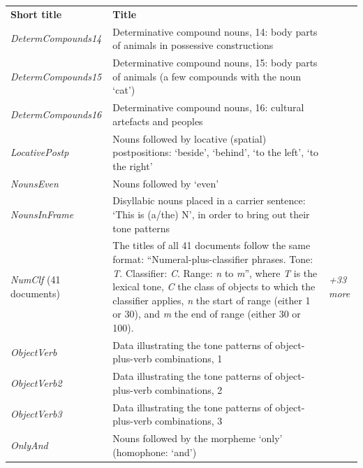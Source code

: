 \begin{table}[H]
  {\renewcommand{\arraystretch}{1.35}
    \begin{tabularx}{\textwidth}{ @{}l Q >{\raggedleft\arraybackslash}P{20mm}}
  \textbf{Short title} & \textbf{Title} &  \\  
      \textit{DetermCompounds14} & Determinative compound nouns, 14: body parts of animals in possessive constructions &  \\
      \textit{DetermCompounds15} & Determinative compound nouns, 15: body parts of animals (a few compounds with the noun ‘cat') &  \\
      \textit{DetermCompounds16} & Determinative compound nouns, 16: cultural artefacts and peoples &  \\
      \textit{LocativePostp} & Nouns followed by locative (spatial) postpositions: ‘beside', ‘behind', ‘to the left', ‘to the right' &  \\
      \textit{NounsEven} & Nouns followed by ‘even' &  \\
      \textit{NounsInFrame} & Disyllabic nouns placed in a carrier sentence: ‘This is \mbox{(a/the)} N', in order to bring out their tone patterns &  \\
      \textit{NumClf} (41 documents) & The titles of all 41 documents follow
      the same format: “Numeral-plus-classifier phrases. Tone:
      \textit{T}. Classifier: \textit{C}. Range: \textit{n} to \textit{m}'', where \textit{T} is the lexical tone, \textit{C} the class of objects to which the classifier applies, \textit{n} the start of range (either 1 or 30), and \textit{m} the end of range (either 30 or 100). &         \textit{+33 more} \\
      \textit{ObjectVerb} & Data illustrating the tone patterns of object-plus-verb combinations, 1 &  \\
      \textit{ObjectVerb2} & Data illustrating the tone patterns of object-plus-verb combinations, 2 &  \\
      \textit{ObjectVerb3} & Data illustrating the tone patterns of object-plus-verb combinations, 3 &  \\
      \textit{OnlyAnd} & Nouns followed by the morpheme ‘only' (homophone: ‘and') &  \\
    \end{tabularx}}
	\end{table}

